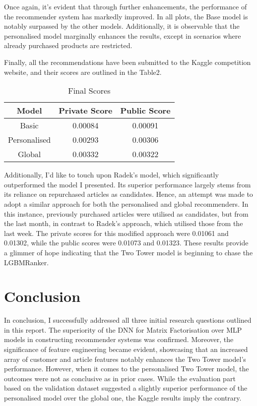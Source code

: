 \documentclass[conference,compsoc]{IEEEtran}
\begin{document}
Once again, it's evident that through further enhancements, the performance of the recommender system has markedly improved. In all plots, the Base model is notably surpassed by the other models. Additionally, it is observable that the personalised model marginally enhances the results, except in scenarios where already purchased products are restricted.

Finally, all the recommendations have been submitted to the Kaggle competition website, and their scores are outlined in the Table2.

\begin{table}[htbp]
    \centering
    \caption{Final Scores}
    \begin{tabular}{|c|c|c|}
        \hline
        Model & Private Score & Public Score \\
        \hline
        Basic & 0.00084 & 0.00091 \\
        Personalised & 0.00293 & 0.00306 \\
        Global & 0.00332 & 0.00322 \\
        \hline
    \end{tabular}
    \label{tab:example}
\end{table}

Additionally, I'd like to touch upon Radek’s model, which significantly outperformed the model I presented. Its superior performance largely stems from its reliance on repurchased articles as candidates. Hence, an attempt was made to adopt a similar approach for both the personalised and global recommenders. In this instance, previously purchased articles were utilised as candidates, but from the last month, in contrast to Radek's approach, which utilised those from the last week. The private scores for this modified approach were 0.01061 and 0.01302, while the public scores were 0.01073 and 0.01323. These results provide a glimmer of hope indicating that the Two Tower model is beginning to chase the LGBMRanker.

\section{Conclusion}
In conclusion, I successfully addressed all three initial research questions outlined in this report. The superiority of the DNN for Matrix Factorisation over MLP models in constructing recommender systems was confirmed. Moreover, the significance of feature engineering became evident, showcasing that an increased array of customer and article features notably enhances the Two Tower model's performance. However, when it comes to the personalised Two Tower model, the outcomes were not as conclusive as in prior cases. While the evaluation part based on the validation dataset suggested a slightly superior performance of the personalised model over the global one, the Kaggle results imply the contrary.
\end{document}
